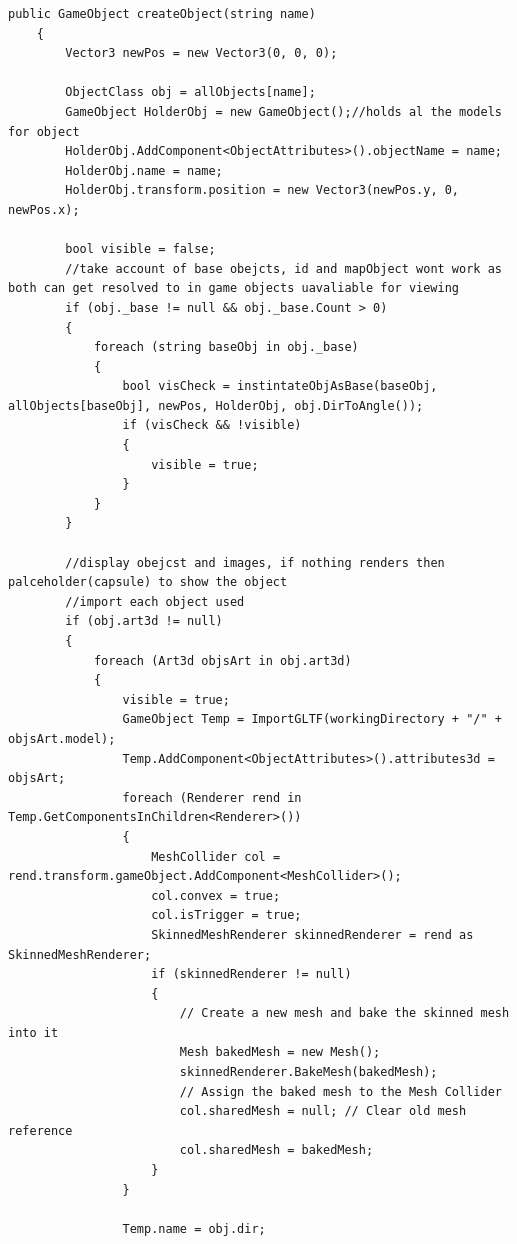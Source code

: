 \begin{lstlisting}[language={[Sharp]C}, caption=C\# code for correct placement of object art from file to scene, label=clst:objCreate]
public GameObject createObject(string name)
    {
        Vector3 newPos = new Vector3(0, 0, 0);

        ObjectClass obj = allObjects[name];
        GameObject HolderObj = new GameObject();//holds al the models for object
        HolderObj.AddComponent<ObjectAttributes>().objectName = name;
        HolderObj.name = name;
        HolderObj.transform.position = new Vector3(newPos.y, 0, newPos.x);

        bool visible = false;
        //take account of base obejcts, id and mapObject wont work as both can get resolved to in game objects uavaliable for viewing
        if (obj._base != null && obj._base.Count > 0)
        {
            foreach (string baseObj in obj._base)
            {
                bool visCheck = instintateObjAsBase(baseObj, allObjects[baseObj], newPos, HolderObj, obj.DirToAngle());
                if (visCheck && !visible)
                {
                    visible = true;
                }
            }
        }

        //display obejcst and images, if nothing renders then palceholder(capsule) to show the object
        //import each object used
        if (obj.art3d != null)
        {
            foreach (Art3d objsArt in obj.art3d)
            {
                visible = true;
                GameObject Temp = ImportGLTF(workingDirectory + "/" + objsArt.model);
                Temp.AddComponent<ObjectAttributes>().attributes3d = objsArt;
                foreach (Renderer rend in Temp.GetComponentsInChildren<Renderer>())
                {
                    MeshCollider col = rend.transform.gameObject.AddComponent<MeshCollider>();
                    col.convex = true;
                    col.isTrigger = true;
                    SkinnedMeshRenderer skinnedRenderer = rend as SkinnedMeshRenderer;
                    if (skinnedRenderer != null)
                    {
                        // Create a new mesh and bake the skinned mesh into it
                        Mesh bakedMesh = new Mesh();
                        skinnedRenderer.BakeMesh(bakedMesh);
                        // Assign the baked mesh to the Mesh Collider
                        col.sharedMesh = null; // Clear old mesh reference
                        col.sharedMesh = bakedMesh;
                    }
                }

                Temp.name = obj.dir;


\end{lstlisting}
